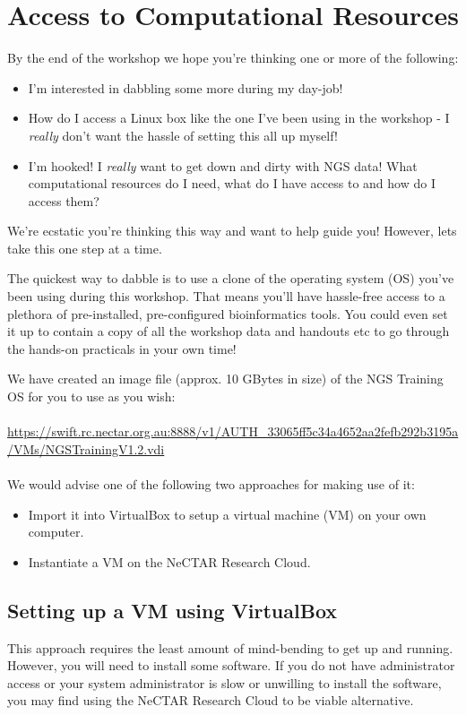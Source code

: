 \section{Access to Computational Resources}

By the end of the workshop we hope you're thinking one or more of the following:

\begin{itemize}
\item I'm interested in dabbling some more during my day-job!
\item How do I access a Linux box like the one I've been using in the workshop -
I \emph{really} don't want the hassle of setting this all up myself!
\item I'm hooked! I \emph{really} want to get down and dirty with NGS data! What
computational resources do I need, what do I have access to and how do I access
them?
\end{itemize}

We're ecstatic you're thinking this way and want to help guide you! However, lets
take this one step at a time.

The quickest way to dabble is to use a clone of the operating system (OS) you've
been using during this workshop. That means you'll have hassle-free access to a
plethora of pre-installed, pre-configured bioinformatics tools. You could even set it
up to contain a copy of all the workshop data and handouts etc to go through the
hands-on practicals in your own time!

We have created an image file (approx. 10 GBytes in size) of the NGS Training OS for you to
use as you wish:
\\\\
\url{https://swift.rc.nectar.org.au:8888/v1/AUTH_33065ff5c34a4652aa2fefb292b3195a/VMs/NGSTrainingV1.2.vdi}
\\\\
We would advise one of the following two approaches for making use of it:

\begin{itemize}
\item Import it into VirtualBox to setup a virtual machine (VM) on your own
computer.
\item Instantiate a VM on the NeCTAR Research Cloud.
\end{itemize}

\subsection{Setting up a VM using VirtualBox}
This approach requires the least amount of mind-bending to get up and running.
However, you will need to install some software. If you do not have
administrator access or your system administrator is slow or unwilling to
install the software, you may find using the NeCTAR Research Cloud to be viable
alternative.

